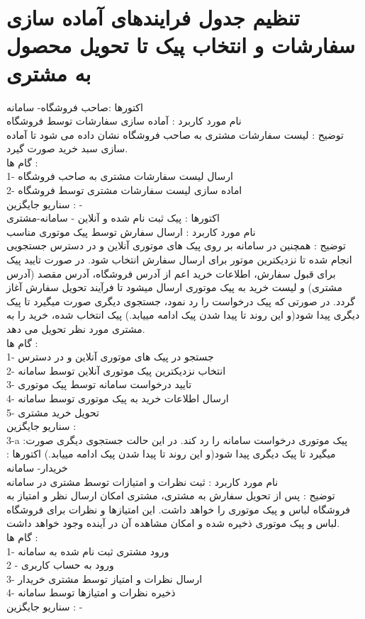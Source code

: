 \documentclass[12pt]{report}
\begin{document}
\section{تنظیم جدول فرایندهای آماده سازی سفارشات و انتخاب پیک تا تحویل محصول به مشتری}

اکتورها :صاحب فروشگاه- سامانه\\
نام مورد کاربرد : آماده سازی سفارشات توسط فروشگاه\\
توضیح : لیست سفارشات مشتری به صاحب فروشگاه نشان داده می شود تا آماده سازی سبد خرید صورت گیرد. \\
گام ها :\\
1- ارسال لیست سفارشات مشتری به صاحب فروشگاه\\
2- اماده سازی لیست سفارشات مشتری توسط فروشگاه\\
سناریو جایگزین : -\\
اکتورها : پیک ثبت نام شده و آنلاین - سامانه-مشتری\\
نام مورد کاربرد : ارسال سفارش توسط پیک موتوری مناسب\\
توضیح : همچنین در سامانه بر روی پیک های موتوری آنلاین و در دسترس جستجویی انجام شده تا نزدیکترین موتور برای ارسال سفارش انتخاب شود. در صورت تایید پیک برای قبول سفارش، اطلاعات خرید اعم از آدرس فروشگاه، آدرس مقصد (آدرس مشتری) و لیست خرید به پیک موتوری ارسال میشود تا فرآیند تحویل سفارش آغاز گردد. در صورتی که پیک درخواست را رد نمود، جستجوی دیگری صورت میگیرد تا پیک دیگری پیدا شود(و این روند تا پیدا شدن پیک ادامه مییابد.) پیک انتخاب شده، خرید را به مشتری مورد نظر تحویل می دهد.\\
گام ها :\\
1- جستجو در پیک های موتوری آنلاین و در دسترس\\
2- انتخاب نزدیکترین پیک موتوری آنلاین توسط سامانه \\
3- تایید درخواست سامانه توسط پیک موتوری\\
4- ارسال اطلاعات خرید به پیک موتوری توسط سامانه\\
5- تحویل خرید مشتری\\
سناریو جایگزین : \\
3-a :پیک موتوری درخواست سامانه را رد کند. در این حالت جستجوی دیگری صورت میگیرد تا پیک دیگری پیدا شود(و این روند تا پیدا شدن پیک ادامه مییابد.)
اکتورها : خریدار- سامانه\\
نام مورد کاربرد : ثبت نظرات و امتیازات توسط مشتری در سامانه\\
توضیح : پس از تحویل سفارش به مشتری، مشتری امکان ارسال نظر و امتیاز به فروشگاه لباس و پیک موتوری را خواهد داشت. این امتیازها و نظرات برای فروشگاه لباس و پیک موتوری ذخیره شده و امکان مشاهده آن در آینده وجود خواهد داشت. \\
گام ها :\\
1-  ورود مشتری ثبت نام شده‌ به سامانه\\
2 - ورود به حساب کاربری\\
3- ارسال نظرات و امتیاز توسط مشتری خریدار\\
4- ذخیره نظرات و امتیازها توسط سامانه\\
سناریو جایگزین : -
 
\end{document}
